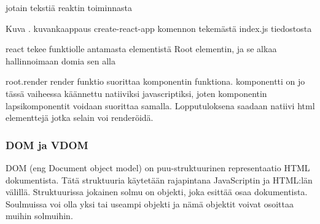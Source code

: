 



jotain tekstiä reaktin toiminnasta 
\bigskip



Kuva \getImgCount{}. kuvankaappaus create-react-app komennon tekemästä index.js tiedostosta
\medskip

react tekee funktiolle antamasta elementistä Root elementin, ja se alkaa hallinnoimaan domia sen alla
\medskip


root.render
render funktio suorittaa komponentin funktiona. komponentti on jo tässä vaiheessa käännettu natiiviksi javascriptiksi, 
joten komponentin lapsikomponentit voidaan suorittaa samalla. Lopputuloksena saadaan natiivi html elementtejä jotka selain voi renderöidä.

\medskip



\subsubsection{DOM ja VDOM}





DOM (eng Document object model) on puu-struktuurinen representaatio HTML dokumentista.
Tätä struktuuria käytetään rajapintana JavaScriptin ja HTML:län välillä. 
Struktuurissa jokainen solmu on objekti, joka esittää osaa dokumentista. 
Soulmuissa voi olla yksi tai useampi objekti ja nämä objektit voivat osoittaa muihin solmuihin.



